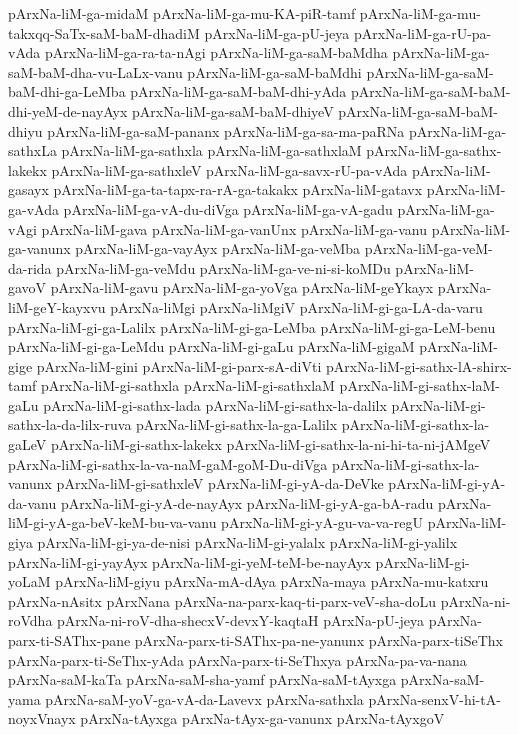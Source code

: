 {pArxNa-liM-ga-midaM
pArxNa-liM-ga-mu-KA-piR-tamf
pArxNa-liM-ga-mu-takxqq-SaTx-saM-baM-dhadiM
pArxNa-liM-ga-pU-jeya
pArxNa-liM-ga-rU-pa-vAda
pArxNa-liM-ga-ra-ta-nAgi
pArxNa-liM-ga-saM-baMdha
pArxNa-liM-ga-saM-baM-dha-vu-LaLx-vanu
pArxNa-liM-ga-saM-baMdhi
pArxNa-liM-ga-saM-baM-dhi-ga-LeMba
pArxNa-liM-ga-saM-baM-dhi-yAda
pArxNa-liM-ga-saM-baM-dhi-yeM-de-nayAyx
pArxNa-liM-ga-saM-baM-dhiyeV
pArxNa-liM-ga-saM-baM-dhiyu
pArxNa-liM-ga-saM-pananx
pArxNa-liM-ga-sa-ma-paRNa
pArxNa-liM-ga-sathxLa
pArxNa-liM-ga-sathxla
pArxNa-liM-ga-sathxlaM
pArxNa-liM-ga-sathx-lakekx
pArxNa-liM-ga-sathxleV
pArxNa-liM-ga-savx-rU-pa-vAda
pArxNa-liM-gasayx
pArxNa-liM-ga-ta-tapx-ra-rA-ga-takakx
pArxNa-liM-gatavx
pArxNa-liM-ga-vAda
pArxNa-liM-ga-vA-du-diVga
pArxNa-liM-ga-vA-gadu
pArxNa-liM-ga-vAgi
pArxNa-liM-gava
pArxNa-liM-ga-vanUnx
pArxNa-liM-ga-vanu
pArxNa-liM-ga-vanunx
pArxNa-liM-ga-vayAyx
pArxNa-liM-ga-veMba
pArxNa-liM-ga-veM-da-rida
pArxNa-liM-ga-veMdu
pArxNa-liM-ga-ve-ni-si-koMDu
pArxNa-liM-gavoV
pArxNa-liM-gavu
pArxNa-liM-ga-yoVga
pArxNa-liM-geYkayx
pArxNa-liM-geY-kayxvu
pArxNa-liMgi
pArxNa-liMgiV
pArxNa-liM-gi-ga-LA-da-varu
pArxNa-liM-gi-ga-Lalilx
pArxNa-liM-gi-ga-LeMba
pArxNa-liM-gi-ga-LeM-benu
pArxNa-liM-gi-ga-LeMdu
pArxNa-liM-gi-gaLu
pArxNa-liM-gigaM
pArxNa-liM-gige
pArxNa-liM-gini
pArxNa-liM-gi-parx-sA-diVti
pArxNa-liM-gi-sathx-lA-shirx-tamf
pArxNa-liM-gi-sathxla
pArxNa-liM-gi-sathxlaM
pArxNa-liM-gi-sathx-laM-gaLu
pArxNa-liM-gi-sathx-lada
pArxNa-liM-gi-sathx-la-dalilx
pArxNa-liM-gi-sathx-la-da-lilx-ruva
pArxNa-liM-gi-sathx-la-ga-Lalilx
pArxNa-liM-gi-sathx-la-gaLeV
pArxNa-liM-gi-sathx-lakekx
pArxNa-liM-gi-sathx-la-ni-hi-ta-ni-jAMgeV
pArxNa-liM-gi-sathx-la-va-naM-gaM-goM-Du-diVga
pArxNa-liM-gi-sathx-la-vanunx
pArxNa-liM-gi-sathxleV
pArxNa-liM-gi-yA-da-DeVke
pArxNa-liM-gi-yA-da-vanu
pArxNa-liM-gi-yA-de-nayAyx
pArxNa-liM-gi-yA-ga-bA-radu
pArxNa-liM-gi-yA-ga-beV-keM-bu-va-vanu
pArxNa-liM-gi-yA-gu-va-va-regU
pArxNa-liM-giya
pArxNa-liM-gi-ya-de-nisi
pArxNa-liM-gi-yalalx
pArxNa-liM-gi-yalilx
pArxNa-liM-gi-yayAyx
pArxNa-liM-gi-yeM-teM-be-nayAyx
pArxNa-liM-gi-yoLaM
pArxNa-liM-giyu
pArxNa-mA-dAya
pArxNa-maya
pArxNa-mu-katxru
pArxNa-nAsitx
pArxNana
pArxNa-na-parx-kaq-ti-parx-veV-sha-doLu
pArxNa-ni-roVdha
pArxNa-ni-roV-dha-shecxV-devxY-kaqtaH
pArxNa-pU-jeya
pArxNa-parx-ti-SAThx-pane
pArxNa-parx-ti-SAThx-pa-ne-yanunx
pArxNa-parx-tiSeThx
pArxNa-parx-ti-SeThx-yAda
pArxNa-parx-ti-SeThxya
pArxNa-pa-va-nana
pArxNa-saM-kaTa
pArxNa-saM-sha-yamf
pArxNa-saM-tAyxga
pArxNa-saM-yama
pArxNa-saM-yoV-ga-vA-da-Lavevx
pArxNa-sathxla
pArxNa-senxV-hi-tA-noyxVnayx
pArxNa-tAyxga
pArxNa-tAyx-ga-vanunx
pArxNa-tAyxgoV
}
